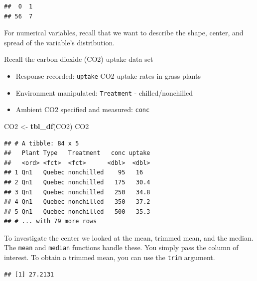 \documentclass[
]{book}
\newenvironment{Shaded}{\begin{snugshade}}{\end{snugshade}}
\newcommand{\KeywordTok}[1]{\textcolor[rgb]{0.13,0.29,0.53}{\textbf{#1}}}
\newcommand{\NormalTok}[1]{#1}
\newcommand{\OperatorTok}[1]{\textcolor[rgb]{0.81,0.36,0.00}{\textbf{#1}}}
\newcommand{\StringTok}[1]{\textcolor[rgb]{0.31,0.60,0.02}{#1}}
\providecommand{\tightlist}{%
  \setlength{\itemsep}{0pt}\setlength{\parskip}{0pt}}
\theoremstyle{definition}
\theoremstyle{definition}
\theoremstyle{definition}
\theoremstyle{remark}
\begin{document}
\begin{verbatim}
##  0  1 
## 56  7
\end{verbatim}

For numerical variables, recall that we want to describe the shape, center, and spread of the variable's distribution.

Recall the carbon dioxide (CO2) uptake data set

\begin{itemize}
\tightlist
\item
  Response recorded: \texttt{uptake} CO2 uptake rates in grass plants\\
\item
  Environment manipulated: \texttt{Treatment} - chilled/nonchilled\\
\item
  Ambient CO2 specified and measured: \texttt{conc}
\end{itemize}

\begin{Shaded}
\begin{Highlighting}[]
\NormalTok{CO2 <-}\StringTok{ }\KeywordTok{tbl_df}\NormalTok{(CO2)}
\NormalTok{CO2}
\end{Highlighting}
\end{Shaded}

\begin{verbatim}
## # A tibble: 84 x 5
##   Plant Type   Treatment   conc uptake
##   <ord> <fct>  <fct>      <dbl>  <dbl>
## 1 Qn1   Quebec nonchilled    95   16  
## 2 Qn1   Quebec nonchilled   175   30.4
## 3 Qn1   Quebec nonchilled   250   34.8
## 4 Qn1   Quebec nonchilled   350   37.2
## 5 Qn1   Quebec nonchilled   500   35.3
## # ... with 79 more rows
\end{verbatim}

To investigate the center we looked at the mean, trimmed mean, and the median. The \texttt{mean} and \texttt{median} functions handle these. You simply pass the column of interest. To obtain a trimmed mean, you can use the \texttt{trim} argument.

\begin{Shaded}
\end{Shaded}

\begin{verbatim}
## [1] 27.2131
\end{verbatim}
\end{document}
